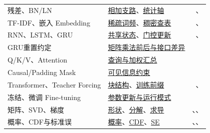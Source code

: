 \begin{xltabular}{\textwidth}{P{52mm}Y r}
残差、BN/LN & \hyperref[sec:cnn-residual]{相加支路}、\hyperref[sec:cnn-normalization]{统计轴} & \pageref{sec:cnn-residual}、\pageref{sec:cnn-normalization}\\
TF-IDF、嵌入 Embedding & \hyperref[sec:text-tfidf]{稀疏词频}、\hyperref[sec:text-embedding]{稠密查表} & \pageref{sec:text-tfidf}、\pageref{sec:text-embedding}\\
RNN、LSTM、GRU & \hyperref[sec:seq-rnn]{共享状态}、\hyperref[sec:seq-gates]{门控更新} & \pageref{sec:seq-rnn}、\pageref{sec:seq-gates}\\
GRU重置约定 & \hyperref[sec:seq-gru-reset]{矩阵乘法前后与接口差异} & \pageref{sec:seq-gru-reset}\\
Q/K/V、Attention & \hyperref[sec:seq-attention]{查询与加权汇总} & \pageref{sec:seq-attention}\\
Causal/Padding Mask & \hyperref[sec:seq-mask]{可见信息约束} & \pageref{sec:seq-mask}\\
Transformer、Teacher Forcing & \hyperref[sec:seq-transformer]{块结构}、\hyperref[sec:seq-encoder-decoder]{训练前缀} & \pageref{sec:seq-transformer}、\pageref{sec:seq-encoder-decoder}\\
冻结、微调 Fine-tuning & \hyperref[sec:transfer-freeze]{参数更新与运行模式} & \pageref{sec:transfer-freeze}\\
矩阵、SVD、梯度 & \hyperref[sec:math-matrix]{形状}、\hyperref[sec:math-spectral]{分解}、\hyperref[sec:math-gradient]{求导} & \pageref{sec:math-matrix}、\pageref{sec:math-spectral}、\pageref{sec:math-gradient}\\
概率、CDF与标准误 & \hyperref[sec:math-probability]{概率}、\hyperref[sec:math-cdf]{CDF}、\hyperref[sec:math-standard-error]{SE} & \pageref{sec:math-probability}、\pageref{sec:math-cdf}、\pageref{sec:math-standard-error}\\

\end{xltabular}
\endgroup
